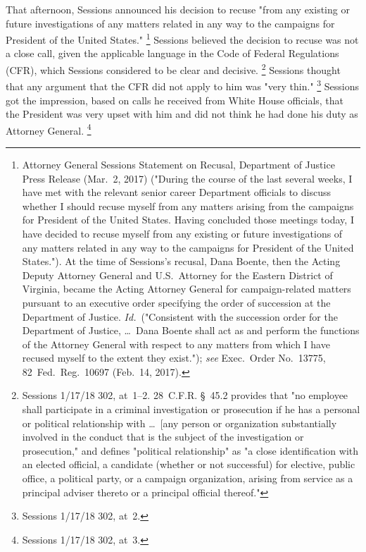 That afternoon, Sessions announced his decision to recuse "from any existing or future investigations of any matters related in any way to the campaigns for President of the United States."%
\footnote{Attorney General Sessions Statement on Recusal, Department of Justice Press Release (Mar.~2, 2017) ("During the course of the last several weeks, I have met with the relevant senior career Department officials to discuss whether I should recuse myself from any matters arising from the campaigns for President of the United States.
Having concluded those meetings today, I have decided to recuse myself from any existing or future investigations of any matters related in any way to the campaigns for President of the United States.").
At the time of Sessions's recusal, Dana Boente, then the Acting Deputy Attorney General and U.S.~Attorney for the Eastern District of Virginia, became the Acting Attorney General for campaign-related matters pursuant to an executive order specifying the order of succession at the Department of Justice.
\textit{Id.}~("Consistent with the succession order for the Department of Justice, \dots\ Dana Boente shall act as and perform the functions of the Attorney General with respect to any matters from which I have recused myself to the extent they exist.");
\textit{see} Exec.\ Order No.~13775, 82~Fed.\ Reg.\ 10697 (Feb.~14, 2017).}
Sessions believed the decision to recuse was not a close call, given the applicable language in the Code of Federal Regulations (CFR), which Sessions considered to be clear and decisive.%
\footnote{Sessions 1/17/18 302, at~1--2. 28~C.F.R. \S~45.2 provides that "no employee shall participate in a criminal investigation or prosecution if he has a personal or political relationship with \dots\ [any person or organization substantially involved in the conduct that is the subject of the investigation or prosecution," and defines "political relationship" as "a close identification with an elected official, a candidate (whether or not successful) for elective, public office, a political party, or a campaign organization, arising from service as a principal adviser thereto or a principal official thereof."}
Sessions thought that any argument that the CFR did not apply to him was "very thin."%
\footnote{Sessions 1/17/18 302, at~2.}
Sessions got the impression, based on calls he received from White House officials, that the President was very upset with him and did not think he had done his duty as Attorney General.%
\footnote{Sessions 1/17/18 302, at~3.}

